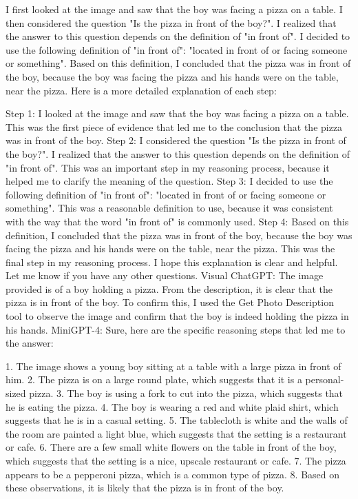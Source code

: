 \begin{enumerate}
        I first looked at the image and saw that the boy was facing a pizza on a table.
        I then considered the question "Is the pizza in front of the boy?". I realized that the answer to this question depends on the definition of "in front of".
        I decided to use the following definition of "in front of": "located in front of or facing someone or something".
        Based on this definition, I concluded that the pizza was in front of the boy, because the boy was facing the pizza and his hands were on the table, near the pizza.
        Here is a more detailed explanation of each step:

        Step 1: I looked at the image and saw that the boy was facing a pizza on a table. This was the first piece of evidence that led me to the conclusion that the pizza was in front of the boy.
        Step 2: I considered the question "Is the pizza in front of the boy?". I realized that the answer to this question depends on the definition of "in front of". This was an important step in my reasoning process, because it helped me to clarify the meaning of the question.
        Step 3: I decided to use the following definition of "in front of": "located in front of or facing someone or something". This was a reasonable definition to use, because it was consistent with the way that the word "in front of" is commonly used.
        Step 4: Based on this definition, I concluded that the pizza was in front of the boy, because the boy was facing the pizza and his hands were on the table, near the pizza. This was the final step in my reasoning process.
        I hope this explanation is clear and helpful. Let me know if you have any other questions.
        \subitem Visual ChatGPT: The image provided is of a boy holding a pizza. From the description, it is clear that the pizza is in front of the boy. To confirm this, I used the Get Photo Description tool to observe the image and confirm that the boy is indeed holding the pizza in his hands.
        \subitem MiniGPT-4: Sure, here are the specific reasoning steps that led me to the answer:

        1. The image shows a young boy sitting at a table with a large pizza in front of him.
        2. The pizza is on a large round plate, which suggests that it is a personal-sized pizza.
        3. The boy is using a fork to cut into the pizza, which suggests that he is eating the pizza.
        4. The boy is wearing a red and white plaid shirt, which suggests that he is in a casual setting.
        5. The tablecloth is white and the walls of the room are painted a light blue, which suggests that the setting is a restaurant or cafe.
        6. There are a few small white flowers on the table in front of the boy, which suggests that the setting is a nice, upscale restaurant or cafe.
        7. The pizza appears to be a pepperoni pizza, which is a common type of pizza.
        8. Based on these observations, it is likely that the pizza is in front of the boy.
    \end{enumerate}
